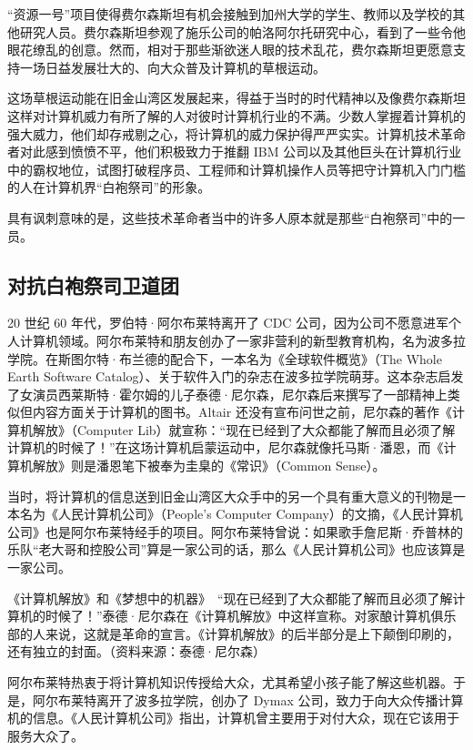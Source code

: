 \documentclass[12pt,UTF8]{ctexbook}
\begin{document}
“资源一号”项目使得费尔森斯坦有机会接触到加州大学的学生、教师以及学校的其他研究人员。费尔森斯坦参观了施乐公司的帕洛阿尔托研究中心，看到了一些令他眼花缭乱的创意。然而，相对于那些渐欲迷人眼的技术乱花，费尔森斯坦更愿意支持一场日益发展壮大的、向大众普及计算机的草根运动。

这场草根运动能在旧金山湾区发展起来，得益于当时的时代精神以及像费尔森斯坦这样对计算机威力有所了解的人对彼时计算机行业的不满。少数人掌握着计算机的强大威力，他们却存戒剔之心，将计算机的威力保护得严严实实。计算机技术革命者对此感到愤愤不平，他们积极致力于推翻 IBM 公司以及其他巨头在计算机行业中的霸权地位，试图打破程序员、工程师和计算机操作人员等把守计算机入门门槛的人在计算机界“白袍祭司”的形象。

具有讽刺意味的是，这些技术革命者当中的许多人原本就是那些“白袍祭司”中的一员。





\subsection{对抗白袍祭司卫道团}


20 世纪 60 年代，罗伯特·阿尔布莱特离开了 CDC 公司，因为公司不愿意进军个人计算机领域。阿尔布莱特和朋友创办了一家非营利的新型教育机构，名为波多拉学院。在斯图尔特·布兰德的配合下，一本名为《全球软件概览》（The Whole Earth Software Catalog）、关于软件入门的杂志在波多拉学院萌芽。这本杂志启发了女演员西莱斯特·霍尔姆的儿子泰德·尼尔森，尼尔森后来撰写了一部精神上类似但内容方面关于计算机的图书。Altair 还没有宣布问世之前，尼尔森的著作《计算机解放》（Computer Lib）就宣称：“现在已经到了大众都能了解而且必须了解计算机的时候了！”在这场计算机启蒙运动中，尼尔森就像托马斯·潘恩，而《计算机解放》则是潘恩笔下被奉为圭臬的《常识》（Common Sense）。

当时，将计算机的信息送到旧金山湾区大众手中的另一个具有重大意义的刊物是一本名为《人民计算机公司》（People's Computer Company）的文摘，《人民计算机公司》也是阿尔布莱特经手的项目。阿尔布莱特曾说：如果歌手詹尼斯·乔普林的乐队“老大哥和控股公司”算是一家公司的话，那么《人民计算机公司》也应该算是一家公司。



《计算机解放》和《梦想中的机器》　“现在已经到了大众都能了解而且必须了解计算机的时候了！”泰德·尼尔森在《计算机解放》中这样宣称。对家酿计算机俱乐部的人来说，这就是革命的宣言。《计算机解放》的后半部分是上下颠倒印刷的，还有独立的封面。（资料来源：泰德·尼尔森）

阿尔布莱特热衷于将计算机知识传授给大众，尤其希望小孩子能了解这些机器。于是，阿尔布莱特离开了波多拉学院，创办了 Dymax 公司，致力于向大众传播计算机的信息。《人民计算机公司》指出，计算机曾主要用于对付大众，现在它该用于服务大众了。
\end{document}
